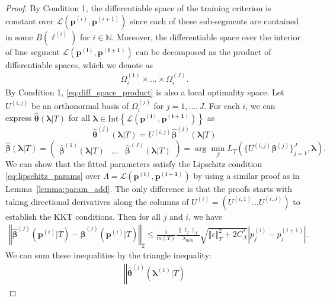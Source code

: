 \documentclass[10pt]{book}
\theoremstyle{definition}
\begin{document}
\begin{proof}
	By Condition 1, the differentiable space of the training criterion
	is constant over $\mathcal{L}\left(\boldsymbol{p}^{(i)},\boldsymbol{p}^{(i+1)}\right)$
	since each of these sub-segments are contained in some $B(\boldsymbol{\ell}^{(i)})$
	for $i\in\mathbb{N}$.
	Moreover, the differentiable space over the interior of line segment $\mathcal{L}\left(\boldsymbol{p^{(i)},p^{(i+1)}}\right)$ can be decomposed as the product of differentiable spaces, which we denote as
	\begin{align}
	\Omega_{i}^{(1)} \times ... \times \Omega_{i}^{(J)}.
	\label{eq:diff_space_product}
	\end{align}
	By Condition 1, \eqref{eq:diff_space_product} is also a local optimality space.
	Let $U^{(i,j)}$ be an orthonormal basis of $\Omega_{i}^{(j)}$ for $j = 1,...,J$.
	For each $i$, we can express $\hat{\boldsymbol{\theta}}(\boldsymbol{\lambda}|T)$
	for all $\boldsymbol{\lambda}\in\mbox{Int}\left\{ \mathcal{L}\left(\boldsymbol{p^{(i)},p^{(i+1)}}\right)\right\} $
	as 
	\[
	\hat{\boldsymbol{\theta}}^{(j)}(\boldsymbol{\lambda}|T)
	=U^{(i,j)}\hat{\boldsymbol{\beta}}^{(j)}(\boldsymbol{\lambda}|T)
	\]
	\[
	\hat{\boldsymbol{\beta}}(\boldsymbol{\lambda}|T)
	= \left (
	\begin{matrix}
	\hat{\boldsymbol{\beta}}^{(1)}(\boldsymbol{\lambda}|T)
	& ... &
	\hat{\boldsymbol{\beta}}^{(J)}(\boldsymbol{\lambda}|T)
	\end{matrix}
	\right )
	=\arg\min_{\beta}L_{T}
	\left (
	\{U^{(i,j)}\boldsymbol{\beta}^{(j)} \}_{j=1}^J,
	\boldsymbol{\lambda}
	\right ).
	\]
	We can show that the fitted parameters satisfy the Lipschitz condition \eqref{eq:lipschitz_params} over $\Lambda=\mathcal{L}\left(\boldsymbol{p^{(i)},p^{(i+1)}}\right)$ by using a similar proof as in Lemma~\ref{lemma:param_add}.
	The only difference is that the proofs starts with taking directional derivatives along the columns of $U^{(i)} = (U^{(i,1)} ... U^{(i,J)})$ to establish the KKT conditions.
	Then for all $j$ and $i$, we have
	\begin{align}
	\left\Vert
	\boldsymbol{\hat{\beta}}^{(j)}(\boldsymbol{p}^{(i)}|T)
	-\boldsymbol{\hat{\beta}}^{(j)}(\boldsymbol{p}^{(i)}|T)
	\right\Vert _{2}
	\le
	\frac{1}{m(T)} \frac{\|\ell_j\|_T}{\lambda_{min}}
	\sqrt{\left\Vert \epsilon \right \Vert_T^2 + 2 C^*_{\Lambda}}
	\left |p^{(i)}_j-p^{(i+1)}_j\right |.
	\end{align}
	We can sum these inequalities by the triangle inequality:
	\begin{align*}
	\left\Vert
	\hat{\boldsymbol{\theta}}^{(j)}(\boldsymbol{\lambda}^{(1)}|T)

\end{align*}
\end{proof}
\end{document}
